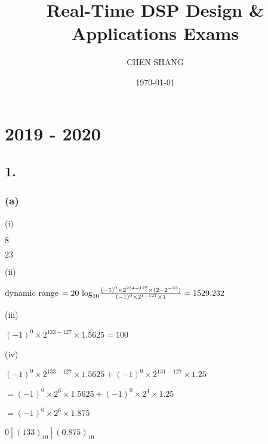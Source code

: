 \documentclass{article}
\title{Real-Time DSP Design \& Applications Exams}
\author{CHEN SHANG }
\date{\today}
\begin{document}
\maketitle
\large

\section*{2019 - 2020}
\subsection*{1.}
\subsubsection*{(a)}
(i)\par
$8$\par
$23$\par\indent
\par
(ii)\par
dynamic range $=20 \ {\rm log}_{10} \frac{(-1)^{0} \times 2^{254-127} \times (2-2^{-23})}{(-1)^{0} \times 2^{1-127} \times 1}=1529.232$\par\indent
\par
(iii)\par
$(-1)^{0} \times 2^{133-127} \times 1.5625=100$\par\indent
\par
(iv)\par
$(-1)^{0} \times 2^{133-127} \times 1.5625+(-1)^{0} \times 2^{131-127} \times 1.25$\par
$=(-1)^{0} \times 2^{6} \times 1.5625+(-1)^{0} \times 2^{4} \times 1.25$\par
$=(-1)^{0} \times 2^{6} \times 1.875$\par
$0 \ | \ (133)_{10} \ | \ (0.875)_{10}$
\end{document}
